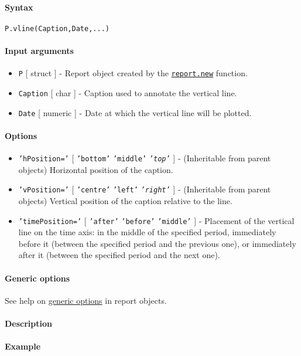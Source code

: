 


	\paragraph{Syntax}\label{syntax}

\begin{verbatim}
P.vline(Caption,Date,...)
\end{verbatim}

\paragraph{Input arguments}\label{input-arguments}

\begin{itemize}
\item
  \texttt{P} {[} struct {]} - Report object created by the
  \href{report/new}{\texttt{report.new}} function.
\item
  \texttt{Caption} {[} char {]} - Caption used to annotate the vertical
  line.
\item
  \texttt{Date} {[} numeric {]} - Date at which the vertical line will
  be plotted.
\end{itemize}

\paragraph{Options}\label{options}

\begin{itemize}
\item
  \texttt{'hPosition='} {[} \texttt{'bottom'} \textbar{}
  \texttt{'middle'} \textbar{} \emph{\texttt{'top'}} {]} - (Inheritable
  from parent objects) Horizontal position of the caption.
\item
  \texttt{'vPosition='} {[} \texttt{'centre'} \textbar{} \texttt{'left'}
  \textbar{} \emph{\texttt{'right'}} {]} - (Inheritable from parent
  objects) Vertical position of the caption relative to the line.
\item
  \texttt{'timePosition='} {[} \texttt{'after'} \textbar{}
  \texttt{'before'} \textbar{} \texttt{'middle'} {]} - Placement of the
  vertical line on the time axis: in the middle of the specified period,
  immediately before it (between the specified period and the previous
  one), or immediately after it (between the specified period and the
  next one).
\end{itemize}

\paragraph{Generic options}\label{generic-options}

See help on \href{report/Contents}{generic options} in report objects.

\paragraph{Description}\label{description}

\paragraph{Example}\label{example}


